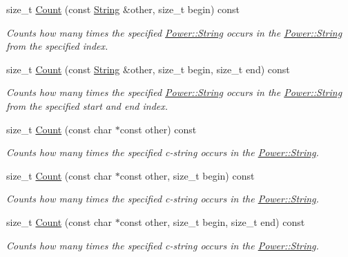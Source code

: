\begin{DoxyCompactItemize}
size\+\_\+t \hyperlink{class_power_1_1_string_ab34fca570ebdd78be571f6df62ea3b55}{Count} (const \hyperlink{class_power_1_1_string}{String} \&other, size\+\_\+t begin) const
\begin{DoxyCompactList}\small\item\em Counts how many times the specified \hyperlink{class_power_1_1_string}{Power\+::\+String} occurs in the \hyperlink{class_power_1_1_string}{Power\+::\+String} from the specified index. \end{DoxyCompactList}\item 
size\+\_\+t \hyperlink{class_power_1_1_string_a28942541669b2d90ad3c922edca312b8}{Count} (const \hyperlink{class_power_1_1_string}{String} \&other, size\+\_\+t begin, size\+\_\+t end) const
\begin{DoxyCompactList}\small\item\em Counts how many times the specified \hyperlink{class_power_1_1_string}{Power\+::\+String} occurs in the \hyperlink{class_power_1_1_string}{Power\+::\+String} from the specified start and end index. \end{DoxyCompactList}\item 
size\+\_\+t \hyperlink{class_power_1_1_string_a34c005f331684e00ba5487239d0f0712}{Count} (const char $\ast$const other) const
\begin{DoxyCompactList}\small\item\em Counts how many times the specified c-\/string occurs in the \hyperlink{class_power_1_1_string}{Power\+::\+String}. \end{DoxyCompactList}\item 
size\+\_\+t \hyperlink{class_power_1_1_string_ad49db0e9e51026e7814453c4d9ce9425}{Count} (const char $\ast$const other, size\+\_\+t begin) const
\begin{DoxyCompactList}\small\item\em Counts how many times the specified c-\/string occurs in the \hyperlink{class_power_1_1_string}{Power\+::\+String}. \end{DoxyCompactList}\item 
size\+\_\+t \hyperlink{class_power_1_1_string_ac229da19a1f75132dfb800b7bcbec2b2}{Count} (const char $\ast$const other, size\+\_\+t begin, size\+\_\+t end) const
\begin{DoxyCompactList}\small\item\em Counts how many times the specified c-\/string occurs in the \hyperlink{class_power_1_1_string}{Power\+::\+String}. \end{DoxyCompactList}\item 

\end{DoxyCompactItemize}
